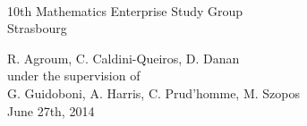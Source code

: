 \begin{frame}[c]


\begin{center}

{\Large{}}\\

\begin{center}
{\large 10th Mathematics Enterprise Study Group\\
Strasbourg}
\end{center}

\bigskip
\textcolor{brunfonce}{R. Agroum, C. Caldini-Queiros, D. Danan \\
under the supervision of\\
G. Guidoboni, A. Harris, C. Prud'homme, M. Szopos}\\
 \bigskip
	\footnotesize\textcolor{brunfonce}{June 27th, 2014}
\end{center}

\end{frame}

%
%
%
%
%
%
